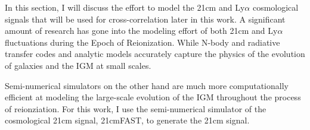 In this section, I will discuss the effort to model the 21cm and Ly$\alpha$
cosmological signals that will be used for cross-correlation later in this work.
A significant amount of research has gone into the modeling effort of both 21cm and
Ly$\alpha$ fluctuations during the Epoch of Reionization. While N-body and radiative transfer
codes and analytic models accurately capture the physics of the evolution of
galaxies and the IGM at small scales.

Semi-numerical simulators on the other hand are much more computationally efficient at
modeling the large-scale evolution of the IGM throughout the process of reionziation.
For this work, I use the semi-numerical simulator of the cosmological 21cm signal,
21cmFAST, to generate the 21cm signal.
